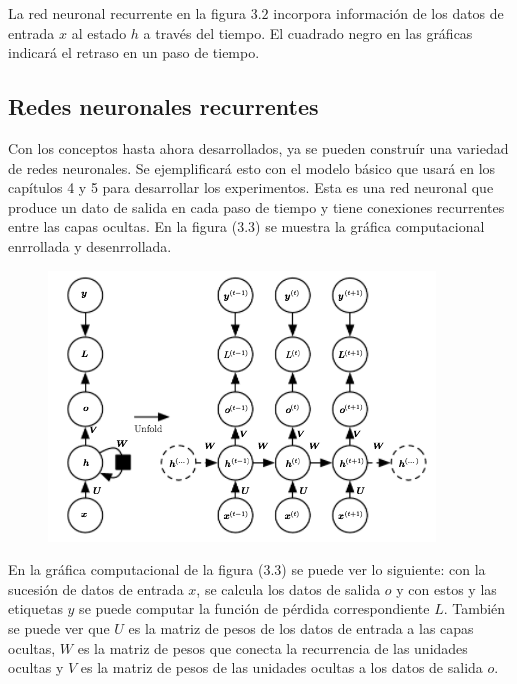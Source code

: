 La red neuronal recurrente en la figura $3.2$ incorpora información de los datos de entrada $x$ al estado $h$ a través del tiempo. El cuadrado negro en las gráficas indicará el retraso en un paso de tiempo.
\cite{goodfellow-et-al-2016}

\subsection{Redes neuronales recurrentes}
Con los conceptos hasta ahora desarrollados, ya se pueden construír una variedad de redes neuronales. Se ejemplificará esto con el modelo básico que usará en los capítulos 4 y 5 para desarrollar los experimentos. Esta es una red neuronal que produce un dato de salida en cada paso de tiempo y tiene conexiones recurrentes entre las capas ocultas. En la figura (3.3) se muestra la gráfica computacional enrrollada y desenrrollada.
\cite{goodfellow-et-al-2016}

\begin{figure}[h]
\begin{center}
\includegraphics{./imag/unfold3.png}
\end{center}
\caption{}
\end{figure}

En la gráfica computacional de la figura (3.3) se puede ver lo siguiente: con la sucesión de datos de entrada $x$, se calcula los datos de salida $o$ y con estos y las etiquetas $y$ se puede computar la función de pérdida correspondiente $L$. También se puede ver que $U$ es la matriz de pesos de los datos de entrada a las capas ocultas, $W$ es la matriz de pesos que conecta la recurrencia de las unidades ocultas y $V$ es la matriz de pesos de las unidades ocultas a los datos de salida $o$.

\vspace{1em}

